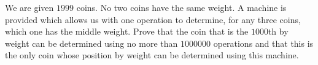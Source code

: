 We are given $1999$ coins. No two coins have the same weight. A machine is provided which allows us with one operation to determine, for any three coins, which one has the middle weight. Prove that the coin that is the $1000$th by weight can be determined using no more than $1000000$ operations and that this is the only coin whose position by weight can be determined using this machine.